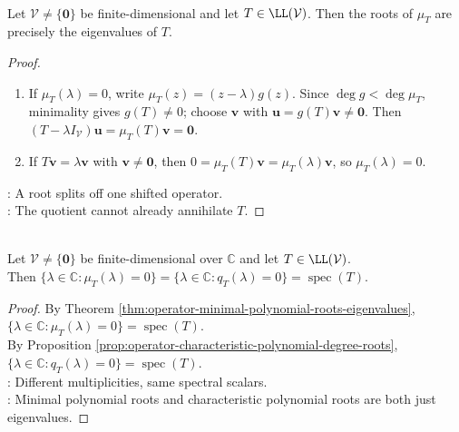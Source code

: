 \begin{theorem} \label{thm:operator-minimal-polynomial-roots-eigenvalues} \\
Let $\mathcal{V}\neq\{\mathbf{0}\}$ be finite-dimensional and let $T\in\LL(\mathcal{V})$. Then the roots of $\mu_T$ are precisely the eigenvalues of $T$.
\begin{proof}
\begin{enumerate}[label=\roman*.]
\setlength{\itemsep}{0pt}
\item[$(\Rightarrow)$] If $\mu_T(\lambda)=0$, write $\mu_T(z)=(z-\lambda)g(z)$. Since $\deg g<\deg\mu_T$, minimality gives $g(T)\neq0$; choose $\mathbf{v}$ with $\mathbf{u}=g(T)\mathbf{v}\neq\mathbf{0}$. Then $(T-\lambda I_{\mathcal{V}})\mathbf{u}=\mu_T(T)\mathbf{v}=\mathbf{0}$.
\item[$(\Leftarrow)$] If $T\mathbf{v}=\lambda\mathbf{v}$ with $\mathbf{v}\neq\mathbf{0}$, then $0=\mu_T(T)\mathbf{v}=\mu_T(\lambda)\mathbf{v}$, so $\mu_T(\lambda)=0$.
\end{enumerate}
: A root splits off one shifted operator.\\
: The quotient cannot already annihilate $T$.
\end{proof}
\end{theorem}

\begin{corollary} \label{cor:operator-minimal-characteristic-same-roots} \\
Let $\mathcal{V}\neq\{\mathbf{0}\}$ be finite-dimensional over $\mathbb{C}$ and let $T\in\LL(\mathcal{V})$.\\
Then $\{\lambda\in\mathbb{C}:\mu_T(\lambda)=0\} = \{\lambda\in\mathbb{C}:q_T(\lambda)=0\} = \operatorname{spec}(T)$.
\begin{proof}
By Theorem \ref{thm:operator-minimal-polynomial-roots-eigenvalues}, $\{\lambda\in\mathbb{C}:\mu_T(\lambda)=0\}=\operatorname{spec}(T)$.\\
By Proposition \ref{prop:operator-characteristic-polynomial-degree-roots}, $\{\lambda\in\mathbb{C}:q_T(\lambda)=0\}=\operatorname{spec}(T)$.\\
: Different multiplicities, same spectral scalars.\\
: Minimal polynomial roots and characteristic polynomial roots are both just eigenvalues.
\end{proof}
\end{corollary}

